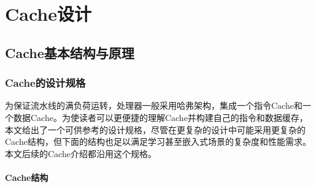 
\chapter{Cache设计}\label{chap:09-cache}

\section{Cache基本结构与原理}\label{sec:09-cache-001}

\subsection{Cache的设计规格}\label{sec:09-cache-002}

为保证流水线的满负荷运转，处理器一般采用哈弗架构，集成一个指令Cache和一个数据Cache。为使读者可以更便捷的理解Cache并构建自己的指令和数据缓存，本文给出了一个可供参考的设计规格，尽管在更复杂的设计中可能采用更复杂的Cache结构，但下面的结构也足以满足学习甚至嵌入式场景的复杂度和性能需求。本文后续的Cache介绍都沿用这个规格。

\subsubsection{Cache结构}\label{sec:09-cache-003}

